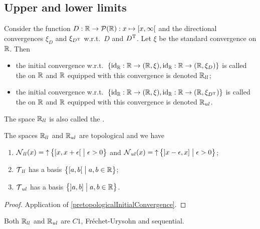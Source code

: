 \subsection{Upper and lower limits}
\begin{definition}
Consider the function $D: \R \to\powerset(\R): x\mapsto \interval[co]{x,\infty}$ and the directional convergences $\xi_D$ and $\xi_{D^{\mathrm{T}}}$ w.r.t.\ $D$ and $D^{\mathrm{T}}$. Let $\xi$ be the standard convergence on $\mathbb{R}$.
Then
\begin{itemize}
\item the initial convergence w.r.t.\ $\{\id_\R: \R\to \sSet{\R,\xi}, \id_\R: \R\to \sSet{\R,\xi_D}\}$ is called the  on $\mathbb{R}$ and $\mathbb{R}$ equipped with this convergence is denoted $\mathbb{R}_{ll}$;
\item the initial convergence w.r.t.\ $\{\id_\R: \R\to \sSet{\R,\xi}, \id_\R: \R\to \sSet{\R,\xi_{D^\transp}}\}$ is called the  on $\mathbb{R}$ and $\mathbb{R}$ equipped with this convergence is denoted $\mathbb{R}_{ul}$.
\end{itemize}
The space $\mathbb{R}_{ll}$ is also called the .
\end{definition}

\begin{proposition}
The spaces $\mathbb{R}_{ll}$ and $\mathbb{R}_{ul}$ are topological and we have
\begin{enumerate}
\item $\neighbourhood_{ll}(x) = \upset \setbuilder[\big]{\interval[co]{x,x+\epsilon}}{\epsilon > 0}$ and $\neighbourhood_{ul}(x) = \upset \setbuilder[\big]{\interval[oc]{x-\epsilon, x}}{\epsilon > 0}$;
\item $\operatorname{\mathcal{T}}_{ll}$ has a basis $\setbuilder[\big]{\interval[co]{a,b}}{a,b\in \R}$;
\item $\operatorname{\mathcal{T}}_{ul}$ has a basis $\setbuilder[\big]{\interval[oc]{a,b}}{a,b\in \R}$.
\end{enumerate}
\end{proposition}
\begin{proof}
Application of \ref{pretopologicalInitialConvergence}.
\end{proof}
\begin{corollary} \label{SorgenfreyLineC1}
Both $\mathbb{R}_{ll}$ and $\mathbb{R}_{ul}$ are $C1$, Fréchet-Urysohn and sequential.
\end{corollary}

